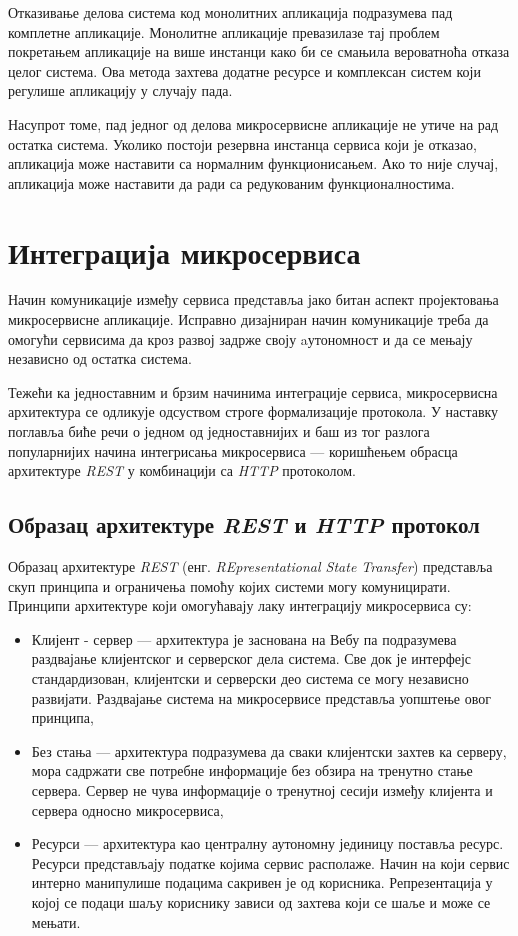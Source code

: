 \documentclass[12pt,oneside]{memoir}
\begin{document}
Отказивање делова система код монолитних апликација подразумева пад комплетне апликације. Монолитне апликације превазилазе тај проблем покретањем апликације на више инстанци како би се смањила вероватноћа отказа целог система. Ова метода захтева додатне ресурсе и комплексан систем који регулише апликацију у случају пада.

Насупрот томе, пад једног од делова микросервисне апликације не утиче на рад остатка система. Уколико постоји резервна инстанца сервиса који је отказао, апликација може наставити са нормалним функционисањем. Ако то није случај, апликација може наставити да ради са редукованим функционалностима.


\section{Интеграција микросервиса}

Начин комуникације између сервиса представља јако битан аспект пројектовања микросервисне апликације. Исправно дизајниран начин комуникације треба да омогући сервисима да кроз развој задрже своју aутономност и да се мењају независно од остатка система. 

Тежећи ка једноставним и брзим начинима интеграције сервиса, микросервисна архитектура се одликује одсуством строге формализације протокола. У наставку поглавља биће речи о једном од једноставнијих и баш из тог разлога популарнијих начина интегрисања микросервиса  --- коришћењем обрасца архитектуре \textit{REST}  у комбинацији са \textit{HTTP} протоколом.

\subsection{Образац архитектуре \textit{REST} и \textit{HTTP} протокол}

Образац архитектуре \textit{REST} (енг. \textit{REpresentational State Transfer}) представља скуп принципа и ограничења помоћу којих системи могу комуницирати. Принципи архитектуре који омогућавају лаку интеграцију микросервиса су:

\begin{itemize}
\item Клијент - сервер  --- архитектура је заснована на Вебу па подразумева раздвајање клијентског и серверског дела система. Све док је интерфејс стандардизован, клијентски и серверски део система се могу независно развијати. Раздвајање система на микросервисе представља уопштење овог принципа,
\item Без стања --- архитектура подразумева да сваки клијентски захтев ка серверу, мора садржати све потребне информације без обзира на тренутно стање сервера. Сервер не чува информације о тренутној сесији између клијента и сервера односно микросервиса,
\item Ресурси --- архитектура као централну аутономну јединицу поставља ресурс. Ресурси представљају податке којима сервис располаже. Начин на који сервис интерно манипулише подацима сакривен је од корисника. Репрезентација у којој се подаци шаљу кориснику зависи од захтева који се шаље и може се мењати.
\end{itemize}
\end{document}
